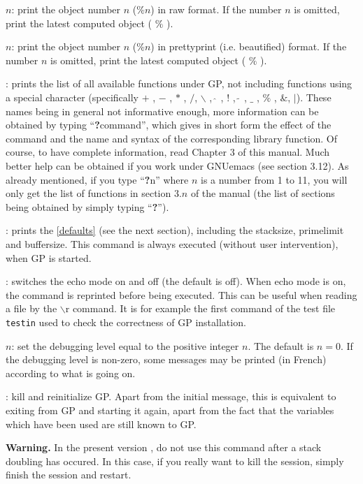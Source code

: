 $n$: print the object number $n$ ($\%n$)
in raw format. If the number $n$ is omitted, print the latest computed object
( $\%$ ).

$n$: print the object number $n$ ($\%n$)
in prettyprint (i.e. beautified) format. If the number $n$ is omitted,
print the latest computed object ( $\%$ ).

: prints the list of all available functions
under GP, not including functions using a special character (specifically
$+$ , $-$ , $*$ , $/$, $\backslash$ , $\hat{\ }$ , $!$ , $\tilde{\ }$ ,
$\_$ , $\%$ , $\&$, $|$). These names being in general not
informative enough, more information can be obtained by typing
``{\bf ?}command'', which gives in short form the effect of the command
and the name and syntax of the corresponding library function.
Of course, to have complete information, read Chapter 3 of this
manual. Much better help can be obtained if you work under GNUemacs
(see section 3.12). As already mentioned, if you type ``{\bf ?}n''
where $n$ is a number from 1 to 11, you will only get the list of
functions in section $3.n$ of the manual (the list of sections
being obtained by simply typing ``{\bf ?}'').

: prints the \ref{defaults} (see the next
section), including the stacksize, primelimit and buffersize. This
command is always executed (without user intervention), when GP is started.

: switches the echo mode on and off (the default
is off). When echo mode is on, the command is reprinted before being executed.
This can be useful when reading a file by the $\backslash$r command. It is
for example the first command of the test file {\tt testin} used to check
the correctness of GP installation.

$n$: set the debugging level equal to the positive
integer $n$. The default is $n=0$. If the debugging level is non-zero, some
messages may be printed (in French) according to what is going on. 

: kill and reinitialize GP. Apart from the
initial message, this is equivalent to exiting from GP and starting it again,
apart from the fact that the variables which have been used are still known
to GP. 

{\bf Warning.} In the present version \vers, do not use this command
after a stack doubling has occured. In this case, if you really want to kill
the session, simply finish the session and restart.

